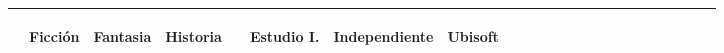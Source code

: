 \begin{table}[]
{\begin{tabular}{|l|l|l|l|l|l|l|l|l|l|l|l|l|l|l|l|l|l|l|l|l|l|l|}
			& \begin{sideways}Ficción \end{sideways}
			& \begin{sideways}Fantasia \end{sideways}
			& \begin{sideways}Historia \end{sideways} & \multicolumn{1}{c|}{}                       
			& \begin{sideways}Estudio I. \end{sideways}
			& \begin{sideways}Independiente \end{sideways}
			& \begin{sideways}Ubisoft \end{sideways}
			\\ \hline
			

\end{tabular}}
\end{table}
